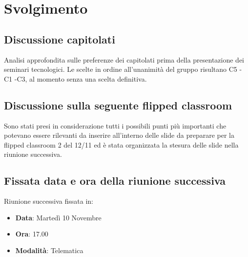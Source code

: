 \documentclass[]{article}
\begin{document}
	\newpage

	\section{Svolgimento}
	\subsection{Discussione capitolati}
	 Analisi approfondita sulle preferenze dei capitolati prima della presentazione dei seminari tecnologici. Le scelte in ordine all'unanimità del gruppo risultano C5 - C1 -C3, al momento senza una scelta definitiva.

	\subsection{Discussione sulla seguente flipped classroom}
	Sono stati presi in considerazione tutti i possibili punti più importanti che potevano essere rilevanti da inserire all'interno delle slide da preparare per la flipped classroom 2  del 12/11 ed è stata organizzata la stesura delle slide nella riunione successiva.
	\subsection{Fissata data e ora della riunione successiva}
	Riunione successiva fissata in:
	\begin{itemize}
		\item \textbf{Data}: Martedì 10 Novembre
		\item \textbf{Ora}: 17.00
		\item \textbf{Modalità}: Telematica
	\end{itemize}

	
\end{document}
